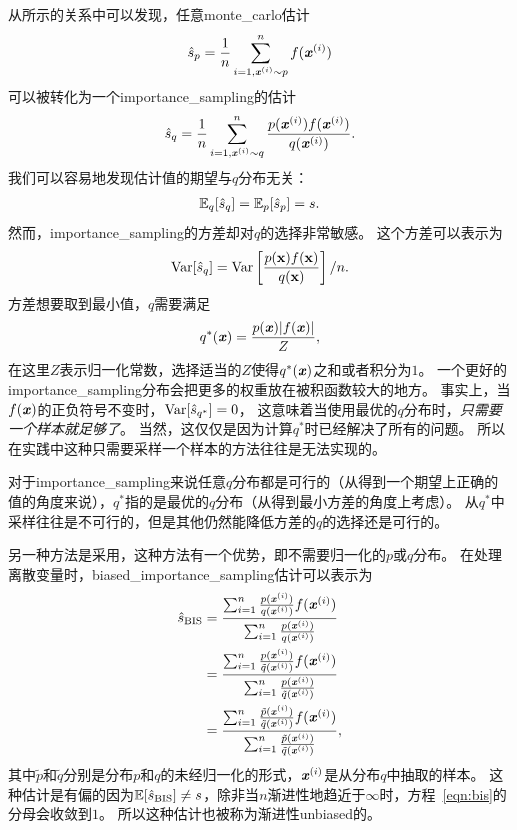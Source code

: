 从所示的关系中可以发现，任意\gls{monte_carlo}估计   
\begin{align}
\hat{s}_p = \frac{1}{n}\sum_{i=1,\boldsymbol{\mathit{x}}^{(i)}\sim p}^{n}f(\boldsymbol{\mathit{x}}^{(i)})
\end{align}
可以被转化为一个\gls{importance_sampling}的估计
\begin{align}
\hat{s}_q = \frac{1}{n}\sum_{i=1,\boldsymbol{\mathit{x}}^{(i)}\sim q}^{n}\frac{p(\boldsymbol{\mathit{x}}^{(i)})f(\boldsymbol{\mathit{x}}^{(i)})}{q(\boldsymbol{\mathit{x}}^{(i)})}.
\end{align}
我们可以容易地发现估计值的期望与$q$分布无关：   
\begin{align}
\mathbb{E}_q [\hat{s}_q] = \mathbb{E}_p [\hat{s}_p] = s.      
\end{align}
然而，\gls{importance_sampling}的方差却对$q$的选择非常敏感。  %
这个方差可以表示为
\begin{align}
\label{eqn:variance_of_is}
\text{Var} [\hat{s}_q] = \text{Var} \left[\frac{p(\mathbf{x})f(\mathbf{x})}{q(\mathbf{x})}\right]/n.
\end{align}
方差想要取到最小值，$q$需要满足
\begin{align}
q^*(\boldsymbol{\mathit{x}}) = \frac{p(\boldsymbol{\mathit{x}})\vert f(\boldsymbol{\mathit{x}})\vert}{Z},
\end{align}
在这里$Z$表示归一化常数，选择适当的$Z$使得$q^*(\boldsymbol{\mathit{x}})$之和或者积分为$1$。
一个更好的\gls{importance_sampling}分布会把更多的权重放在被积函数较大的地方。   %
事实上，当$f(\boldsymbol{\mathit{x}})$的正负符号不变时，$\text{Var}[\hat{s}_{q^*}]=0$， 这意味着当使用最优的$q$分布时，\emph{只需要一个样本就足够了}。 %
当然，这仅仅是因为计算$q^*$时已经解决了所有的问题。   
所以在实践中这种只需要采样一个样本的方法往往是无法实现的。 %


对于\gls{importance_sampling}来说任意$q$分布都是可行的（从得到一个期望上正确的值的角度来说），$q^*$指的是最优的$q$分布（从得到最小方差的角度上考虑）。
从$q^*$中采样往往是不可行的，但是其他仍然能降低方差的$q$的选择还是可行的。 


另一种方法是采用，这种方法有一个优势，即不需要归一化的$p$或$q$分布。
在处理离散变量时，\gls{biased_importance_sampling}估计可以表示为
\begin{align}
\label{eqn:bis}
\hat{s}_{\text{BIS}} & = \frac{\sum_{i=1}^{n} \frac{p(\boldsymbol{\mathit{x}}^{(i)})}{q(\boldsymbol{\mathit{x}}^{(i)})} f(\boldsymbol{\mathit{x}}^{(i)})}{\sum_{i=1}^{n}\frac{p(\boldsymbol{\mathit{x}}^{(i)})}{q(\boldsymbol{\mathit{x}}^{(i)})}} \\
& = \frac{\sum_{i=1}^{n} \frac{p(\boldsymbol{\mathit{x}}^{(i)})}{\tilde{q}(\boldsymbol{\mathit{x}}^{(i)})} f(\boldsymbol{\mathit{x}}^{(i)})}{\sum_{i=1}^{n}\frac{p(\boldsymbol{\mathit{x}}^{(i)})}{\tilde{q}(\boldsymbol{\mathit{x}}^{(i)})}} \\
& = \frac{\sum_{i=1}^{n} \frac{\tilde{p}(\boldsymbol{\mathit{x}}^{(i)})}{\tilde{q}(\boldsymbol{\mathit{x}}^{(i)})} f(\boldsymbol{\mathit{x}}^{(i)})}{\sum_{i=1}^{n}\frac{\tilde{p}(\boldsymbol{\mathit{x}}^{(i)})}{\tilde{q}(\boldsymbol{\mathit{x}}^{(i)})}},
\end{align}
其中$\tilde{p}$和$\tilde{q}$分别是分布${p}$和${q}$的未经归一化的形式，$\boldsymbol{\mathit{x}}^{(i)}$是从分布${q}$中抽取的样本。
这种估计是有偏的因为$\mathbb{E}[\hat{s}_{\text{BIS}}]\neq s$，除非当$n$渐进性地趋近于$\infty$时，方程~\eqref{eqn:bis}的分母会收敛到$1$。
所以这种估计也被称为渐进性\gls{unbiased}的。   %


